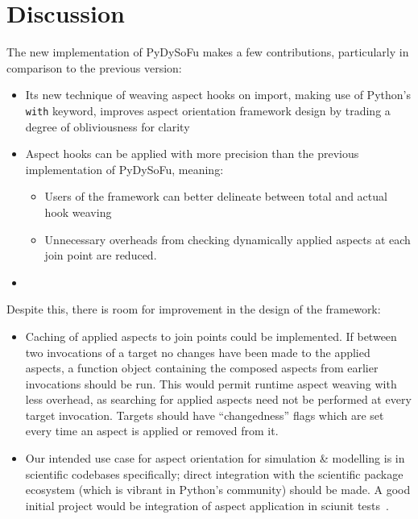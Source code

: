 



\section{Discussion}

The new implementation of PyDySoFu makes a few contributions, particularly in
comparison to the previous version:

\begin{itemize}
    \item Its new technique of weaving aspect hooks on import, making use of
    Python's \lstinline{with} keyword, improves aspect orientation framework
    design by trading a degree of obliviousness for clarity
    \item Aspect hooks can be applied with more precision than the previous
    implementation of PyDySoFu, meaning:
        \begin{itemize}
        \item Users of the framework can better delineate between total and
        actual hook weaving
        \item Unnecessary overheads from checking dynamically applied aspects at
        each join point are reduced.
        \end{itemize}
    \item 
\end{itemize}

Despite this, there is room for improvement in the design of the framework:

\begin{itemize}
    \item Caching of applied aspects to join points could be implemented. If
    between two invocations of a target no changes have been made to the applied
    aspects, a function object containing the composed aspects from earlier
    invocations should be run. This would permit runtime aspect weaving with
    less overhead, as searching for applied aspects need not be performed at
    every target invocation. Targets should have ``changedness'' flags which are
    set every time an aspect is applied or removed from it.
    \item Our intended use case for aspect orientation for simulation \&
    modelling is in scientific codebases specifically; direct integration with
    the scientific package ecosystem (which is vibrant in Python's community)
    should be made. A good initial project would be integration of aspect
    application in sciunit tests~\cite{sciunit_primer}.
\end{itemize}

